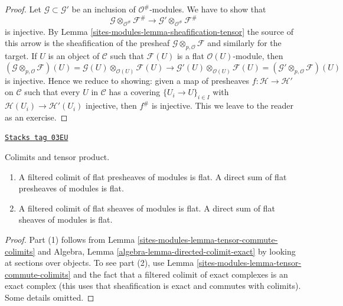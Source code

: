 \begin{proof}
Let $\mathcal{G} \subset \mathcal{G}'$ be an inclusion of
$\mathcal{O}^\#$-modules. We have to show that
$$
\mathcal{G} \otimes_{\mathcal{O}^\#} \mathcal{F}^\#
\longrightarrow
\mathcal{G}' \otimes_{\mathcal{O}^\#} \mathcal{F}^\#
$$
is injective. By Lemma \ref{sites-modules-lemma-sheafification-tensor}
the source of this arrow is the sheafification of
the presheaf $\mathcal{G} \otimes_{p, \mathcal{O}} \mathcal{F}$
and similarly for the target. If $U$ is an object of $\mathcal{C}$ such that
$\mathcal{F}(U)$ is a flat $\mathcal{O}(U)$-module, then
$$
(\mathcal{G} \otimes_{p, \mathcal{O}} \mathcal{F})(U) =
\mathcal{G}(U) \otimes_{\mathcal{O}(U)} \mathcal{F}(U)
\longrightarrow
\mathcal{G}'(U) \otimes_{\mathcal{O}(U)} \mathcal{F}(U) =
(\mathcal{G}' \otimes_{p, \mathcal{O}} \mathcal{F})(U)
$$
is injective. Hence we reduce to showing: given a map of presheaves
$f : \mathcal{H} \to \mathcal{H}'$ on $\mathcal{C}$ such that
every $U$ in $\mathcal{C}$ has a covering $\{U_i \to U\}_{i \in I}$
with $\mathcal{H}(U_i) \to \mathcal{H}'(U_i)$ injective, then
$f^\#$ is injective. This we leave to the reader as an exercise.
\end{proof}

\begin{lemma}
\label{sites-modules-lemma-colimits-flat}
\href{https://stacks.math.columbia.edu/tag/03EU}{\texttt{Stacks tag 03EU}}

Colimits and tensor product.
\begin{enumerate}
\item A filtered colimit of flat presheaves of modules
is flat. A direct sum of flat presheaves of modules is flat.
\item A filtered colimit of flat sheaves of modules is flat.
A direct sum of flat sheaves of modules is flat.
\end{enumerate}
\end{lemma}

\begin{proof}
Part (1) follows from Lemma \ref{sites-modules-lemma-tensor-commute-colimits} and
Algebra, Lemma \ref{algebra-lemma-directed-colimit-exact}
by looking at sections over objects.
To see part (2), use Lemma \ref{sites-modules-lemma-tensor-commute-colimits} and
the fact that a filtered colimit of exact
complexes is an exact complex (this uses that sheafification is exact
and commutes with colimits). Some details omitted.
\end{proof}

